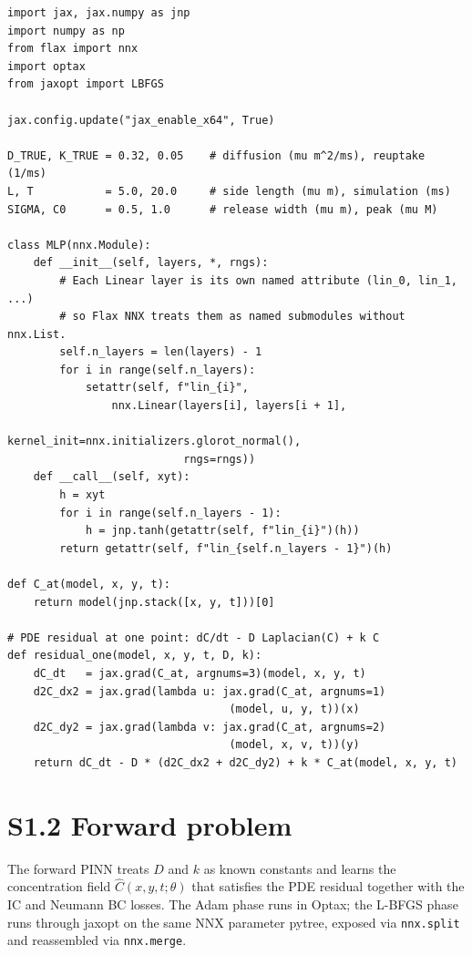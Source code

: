 \documentclass[12pt]{article}
\begin{document}
\begin{verbatim}
import jax, jax.numpy as jnp
import numpy as np
from flax import nnx
import optax
from jaxopt import LBFGS

jax.config.update("jax_enable_x64", True)

D_TRUE, K_TRUE = 0.32, 0.05    # diffusion (mu m^2/ms), reuptake (1/ms)
L, T           = 5.0, 20.0     # side length (mu m), simulation (ms)
SIGMA, C0      = 0.5, 1.0      # release width (mu m), peak (mu M)

class MLP(nnx.Module):
    def __init__(self, layers, *, rngs):
        # Each Linear layer is its own named attribute (lin_0, lin_1, ...)
        # so Flax NNX treats them as named submodules without nnx.List.
        self.n_layers = len(layers) - 1
        for i in range(self.n_layers):
            setattr(self, f"lin_{i}",
                nnx.Linear(layers[i], layers[i + 1],
                           kernel_init=nnx.initializers.glorot_normal(),
                           rngs=rngs))
    def __call__(self, xyt):
        h = xyt
        for i in range(self.n_layers - 1):
            h = jnp.tanh(getattr(self, f"lin_{i}")(h))
        return getattr(self, f"lin_{self.n_layers - 1}")(h)

def C_at(model, x, y, t):
    return model(jnp.stack([x, y, t]))[0]

# PDE residual at one point: dC/dt - D Laplacian(C) + k C
def residual_one(model, x, y, t, D, k):
    dC_dt   = jax.grad(C_at, argnums=3)(model, x, y, t)
    d2C_dx2 = jax.grad(lambda u: jax.grad(C_at, argnums=1)
                                  (model, u, y, t))(x)
    d2C_dy2 = jax.grad(lambda v: jax.grad(C_at, argnums=2)
                                  (model, x, v, t))(y)
    return dC_dt - D * (d2C_dx2 + d2C_dy2) + k * C_at(model, x, y, t)
\end{verbatim}

\section*{S1.2 Forward problem}

The forward PINN treats $D$ and $k$ as known constants and learns
the concentration field $\hat{C}(x, y, t; \theta)$ that satisfies
the PDE residual together with the IC and Neumann BC losses. The
Adam phase runs in Optax; the L-BFGS phase runs through jaxopt on
the same NNX parameter pytree, exposed via \texttt{nnx.split} and
reassembled via \texttt{nnx.merge}.
\end{document}

